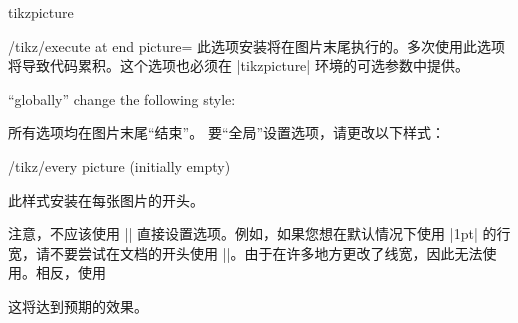 \begin{environment}{{tikzpicture}}
\begin{key}{/tikz/execute at end picture=}
        此选项安装将在图片末尾执行的。多次使用此选项将导致代码累积。这个选项也必须在 |{tikzpicture}| 环境的可选参数中提供。
\begin{codeexample}[preamble={\usetikzlibrary{backgrounds}}]
\end{codeexample}
    \end{key}

    ``globally'' change the following style:

    所有选项均在图片末尾``结束''。 要``全局''设置选项，请更改以下样式：
    \begin{stylekey}{/tikz/every picture (initially \normalfont empty)}

        此样式安装在每张图片的开头。
\begin{codeexample}
\tikzset{every picture/.style=semithick}
\end{codeexample}
    \end{stylekey}


    注意，不应该使用 |\tikzset| 直接设置选项。例如，如果您想在默认情况下使用 |1pt| 的行宽，请不要尝试在文档的开头使用 |\tikzset{line width=1pt}|。由于在许多地方更改了线宽，因此无法使用。相反，使用
\begin{codeexample}
\end{codeexample}
    这将达到预期的效果。
\end{environment}


